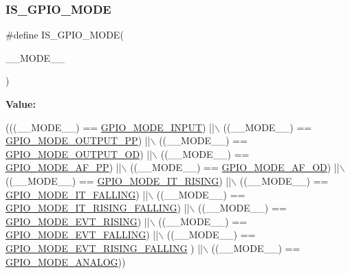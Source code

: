 \subsubsection{\texorpdfstring{I\+S\+\_\+\+G\+P\+I\+O\+\_\+\+M\+O\+DE}{IS\_GPIO\_MODE}}
{\footnotesize\ttfamily \#define I\+S\+\_\+\+G\+P\+I\+O\+\_\+\+M\+O\+DE(\begin{DoxyParamCaption}\item[{}]{\+\_\+\+\_\+\+M\+O\+D\+E\+\_\+\+\_\+ }\end{DoxyParamCaption})}

{\bfseries Value\+:}
\begin{DoxyCode}
(((\_\_MODE\_\_) == \hyperlink{group___g_p_i_o__mode_gaf40bec3146810028a84b628d37d3b391}{GPIO\_MODE\_INPUT})              ||\(\backslash\)
                                     ((\_\_MODE\_\_) == \hyperlink{group___g_p_i_o__mode_ga1013838a64cec2f8c88f079c449d1982}{GPIO\_MODE\_OUTPUT\_PP})          ||\(\backslash\)
                                     ((\_\_MODE\_\_) == \hyperlink{group___g_p_i_o__mode_ga2f91757829f6e9505ec386b840941929}{GPIO\_MODE\_OUTPUT\_OD})          ||\(\backslash\)
                                     ((\_\_MODE\_\_) == \hyperlink{group___g_p_i_o__mode_ga526c72c5264316fc05c775b6cad4aa6a}{GPIO\_MODE\_AF\_PP})              ||\(\backslash\)
                                     ((\_\_MODE\_\_) == \hyperlink{group___g_p_i_o__mode_ga282b9fd37c8ef31daba314ffae6bf023}{GPIO\_MODE\_AF\_OD})              ||\(\backslash\)
                                     ((\_\_MODE\_\_) == \hyperlink{group___g_p_i_o__mode_ga088659562e68426d9a72821ea4fd8d50}{GPIO\_MODE\_IT\_RISING})          ||\(\backslash\)
                                     ((\_\_MODE\_\_) == \hyperlink{group___g_p_i_o__mode_gaa166210a6da3ac7e8d7504702520e522}{GPIO\_MODE\_IT\_FALLING})         ||\(\backslash\)
                                     ((\_\_MODE\_\_) == \hyperlink{group___g_p_i_o__mode_ga0678e61090ed61e91a6496f22ddfb3d1}{GPIO\_MODE\_IT\_RISING\_FALLING})
        ||\(\backslash\)
                                     ((\_\_MODE\_\_) == \hyperlink{group___g_p_i_o__mode_ga97d78b82ea178ff7a4c35aa60b4e9338}{GPIO\_MODE\_EVT\_RISING})         ||\(\backslash\)
                                     ((\_\_MODE\_\_) == \hyperlink{group___g_p_i_o__mode_gadbfa532b3566783ac6c0e07c2e0ffe5e}{GPIO\_MODE\_EVT\_FALLING})        ||\(\backslash\)
                                     ((\_\_MODE\_\_) == \hyperlink{group___g_p_i_o__mode_ga1b760771297ed2fc55a6b13071188491}{GPIO\_MODE\_EVT\_RISING\_FALLING}
      ) ||\(\backslash\)
                                     ((\_\_MODE\_\_) == \hyperlink{group___g_p_i_o__mode_ga7a04f9ab65ad572ad20791a35009220c}{GPIO\_MODE\_ANALOG}))
\end{DoxyCode}
\mbox{\label{group___g_p_i_o___private___macros_ga4911823233fa2bf64a4f04c6dbfa5485}} 
